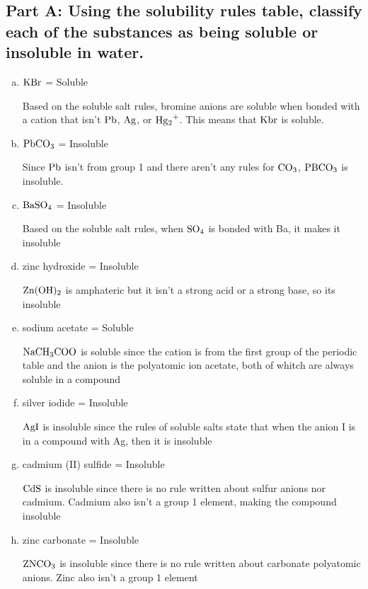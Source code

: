\documentclass{scrartcl}
\begin{document}
\subsection{Part A: Using the solubility rules table, classify each of the substances as being soluble or insoluble in water.}
\label{sec:org446cc82}
\begin{enumerate}[a.]
\item \(\ce{KBr}\) = Soluble

Based on the soluble salt rules, bromine anions are
soluble when bonded with a cation that isn't \(\ce{Pb}\), \(\ce{Ag}\),
or \(\ce{Hg2+}\). This means that \(\ce{Kbr}\) is soluble.

\item \(\ce{PbCO3}\) = Insoluble

Since \(\ce{Pb}\) isn't from group 1 and there
aren't any rules for \(\ce{CO3}\), \(\ce{PBCO3}\) is insoluble.

\item \(\ce{BaSO4}\) = Insoluble

Based on the soluble salt rules, when
\(\ce{SO4}\) is bonded with Ba, it makes it insoluble

\item zinc hydroxide = Insoluble

\(\ce{Zn(OH)2}\) is amphateric but it isn't a
strong acid or a strong base, so its insoluble

\item sodium acetate = Soluble

\(\ce{NaCH3COO}\) is soluble since the cation is
from the first group of the periodic table and the anion is the polyatomic
ion acetate, both of whitch are always soluble in a compound

\item silver iodide = Insoluble

\(\ce{AgI}\) is insoluble since the rules of
soluble salts state that when the anion I is in a compound with Ag, then it
is insoluble

\item cadmium (II) sulfide = Insoluble

\(\ce{CdS}\) is insoluble since there is
no rule written about sulfur anions nor cadmium. Cadmium also isn't a group 1
element, making the compound insoluble

\item zinc carbonate = Insoluble

\(\ce{ZNCO3}\) is insoluble since there is no
rule written about carbonate polyatomic anions. Zinc also isn't a group 1
element


\end{enumerate}
\end{document}
